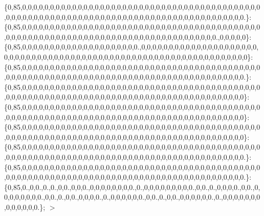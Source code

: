 \{0,85,0,0,0,0,0,0,0,0,0,0,0,0,0,0,0,0,0,0,0,0,0,0,0,0,0,0,0,0,0,0,0,0,0,0,0,0,0,0,0,0,0,0,0,0,0,0,0,0,0,0,0,0,0,0,0,0,0,0,0,0,0,0,0,0,0,0,0,0,0,0,0,0,0,0,0,0,0,0,0,0,0,0,0,0,0,0.\}\+: \{0,85,0,0,0,0,0,0,0,0,0,0,0,0,0,0,0,0,0,0,0,0,0,0,0,0,0,0,0,0,0,0,0,0,0,0,0,0,0,0,0,0,0,0,0,0,0,0,0,0,0,0,0,0,0,0,0,0,0,0,0,0,0,0,0,0,0,0,0,0,0,0,0,0,0,0,0,0,0,0,0,0,0.,0,0,0,0,0\}\+: \{0,85,0,0,0,0,0,0,0,0,0,0,0,0,0,0,0,0,0,0,0,0,0.,0,0,0,0,0,0,0,0,0,0,0,0,0,0,0,0,0,0,0,0,0,0,0,0,0,0,0,0,0,0,0,0,0,0,0,0,0,0,0,0,0,0,0,0,0,0,0,0,0,0,0,0,0,0,0,0,0,0,0,0,0,0,0,0,0\}\+: \{0,85,0,0,0,0,0,0,0,0,0,0,0,0,0,0,0,0,0,0,0,0,0,0,0,0,0,0,0,0,0,0,0,0,0,0,0,0,0,0,0,0,0,0,0,0,0,0,0,0,0,0,0,0,0,0,0,0,0,0,0,0,0,0,0,0,0,0,0,0,0,0,0,0,0,0,0,0,0,0,0,0,0,0,0,0,0,0.\}\+: \{0,85,0,0,0,0,0,0,0,0,0,0,0,0,0,0,0,0,0,0,0,0,0,0,0,0,0,0,0,0,0,0,0,0,0,0,0,0,0,0,0,0,0,0,0,0,0,0,0,0,0,0,0,0,0,0,0,0,0,0,0,0,0,0,0,0,0,0,0,0,0,0,0,0,0,0,0,0,0,0,0,0,0,0,0,0,0,0\}\+: \{0,85,0,0,0,0,0,0,0,0,0,0,0,0,0,0,0,0,0,0,0,0,0,0,0,0,0,0,0,0,0,0,0,0,0,0,0,0,0,0,0,0,0,0,0,0,0,0,0,0,0,0,0,0,0,0,0,0,0,0,0,0,0,0,0,0,0,0,0,0,0,0,0,0,0,0,0,0,0,0,0,0,0,0,0,0,0,0\}\+: \{0,85,0,0,0,0,0,0,0,0,0,0,0,0,0,0,0,0,0,0,0,0,0,0,0,0,0,0,0,0,0,0,0,0,0,0,0,0,0,0,0,0,0,0,0,0,0,0,0,0,0,0,0,0,0,0,0,0,0,0,0,0,0,0,0,0,0,0,0,0,0,0,0,0,0,0,0,0,0,0,0,0,0,0,0,0,0,0\}\+: \{0,85,0,0,0,0,0,0,0,0,0,0,0,0,0,0,0,0,0,0,0,0,0,0,0,0,0,0,0,0,0,0,0,0,0,0,0,0,0,0,0,0,0,0,0,0,0,0,0,0,0,0,0,0,0,0,0,0,0,0,0,0,0,0,0,0,0,0,0,0,0,0,0,0,0,0,0,0,0,0,0,0,0,0,0,0,0,0.\}\+: \{0,85,0,0,0,0,0,0,0,0,0,0,0,0,0,0,0,0,0,0,0,0,0,0,0,0,0,0,0,0,0,0,0,0,0,0,0,0,0,0,0,0,0,0,0,0,0,0,0,0,0,0,0,0,0,0,0,0,0,0,0,0,0,0,0,0,0,0,0,0,0,0,0,0,0,0,0,0,0,0,0,0,0,0,0,0,0,0.\}\+: \{0,85,0.,0,0.,0.,0.,0,0.,0,0,0.,0,0,0,0,0,0,0,0.,0.,0,0,0,0,0,0,0,0,0.,0,0.,0.,0,0,0,0.,0,0.,0,0,0,0,0,0,0,0.,0,0.,0.,0,0.,0,0,0,0.,0.,0,0,0,0,0,0.,0,0.,0.,0,0.,0,0,0,0,0,0.,0.,0,0,0,0,0,0,0,0,0,0,0,0,0.\}; $>$ 